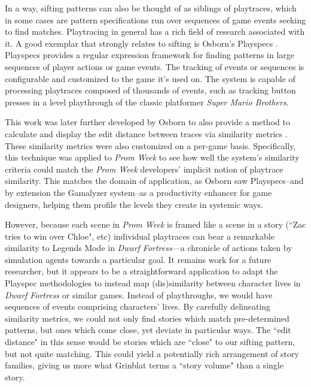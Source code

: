 In a way, sifting patterns can also be thought of as siblings of playtraces, which in some cases are pattern specifications run over sequences of game events seeking to find matches. Playtracing in general has a rich field of research associated with it. A good exemplar that strongly relates to sifting is Osborn's Playspecs \cite{osborn2015playspecs}. Playspecs provides a regular expression framework for finding patterns in large sequences of player actions or game events. The tracking of events or sequences is configurable and customized to the game it's used on. The system is capable of processing playtraces composed of thousands of events, such as tracking button presses in a level playthrough of the classic platformer \textit{Super Mario Brothers}.

This work was later further developed by Osborn to also provide a method to calculate and display the edit distance between traces via similarity metrics \cite{osborn2014evaluating}. These similarity metrics were also customized on a per-game basis. Specifically, this technique was applied to \textit{Prom Week} \cite{mccoy2012prom} to see how well the system’s similarity criteria could match the \textit{Prom Week} developers’ implicit notion of playtrace similarity. This matches the domain of application, as Osborn saw Playspecs--and by extension the Gamalyzer system--as a productivity enhancer for game designers, helping them profile the levels they create in systemic ways.

However, because each scene in \textit{Prom Week} is framed like a scene in a story (``Zac tries to win over Chloe", etc) individual playtraces can bear a remarkable similarity to Legends Mode in \textit{Dwarf Fortress}---a chronicle of actions taken by simulation agents towards a particular goal. It remains work for a future researcher, but it appears to be a straightforward application to adapt the Playspec methodologies to instead map (dis)similarity between character lives in \textit{Dwarf Fortress} or similar games. Instead of playthroughs, we would have sequences of events comprising characters' lives. By carefully delineating similarity metrics, we could not only find stories which match pre-determined patterns, but ones which come close, yet deviate in particular ways. The ``edit distance" in this sense would be stories which are ``close" to our sifting pattern, but not quite matching. This could yield a potentially rich arrangement of story families, giving us more what Grinblat terms a ``story volume" \cite{grinblat2017emergent} than a single story.

